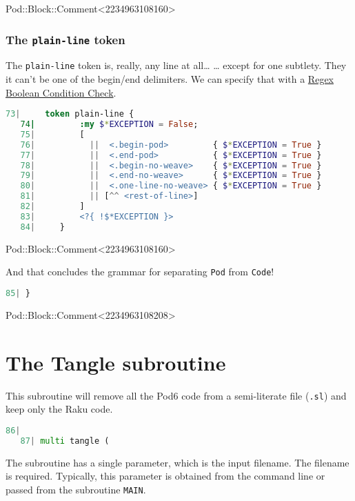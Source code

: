 \documentclass{scrartcl}
\begin{document}
Pod::Block::Comment<2234963108160>

\subsubsection{The \texttt{plain-line} token}

The \texttt{plain-line} token is, really, any line at all… … except for one
subtlety. They it can't be one of the begin/end delimiters. We can specify
that with a
\href{https://docs.raku.org/language/regexes\#Regex_Boolean_condition_check}{Regex
Boolean Condition Check}.

\begin{lstlisting}[language=Raku]
   73|     token plain-line {
   74|         :my $*EXCEPTION = False;
   75|         [
   76|           ||  <.begin-pod>         { $*EXCEPTION = True }
   77|           ||  <.end-pod>           { $*EXCEPTION = True }
   78|           ||  <.begin-no-weave>    { $*EXCEPTION = True }
   79|           ||  <.end-no-weave>      { $*EXCEPTION = True }
   80|           ||  <.one-line-no-weave> { $*EXCEPTION = True }
   81|           || [^^ <rest-of-line>]
   82|         ]
   83|         <?{ !$*EXCEPTION }>
   84|     } 

\end{lstlisting}


Pod::Block::Comment<2234963108160>

And that concludes the grammar for separating \texttt{Pod} from
\texttt{Code}!

\begin{lstlisting}[language=Raku]
   85| } 

\end{lstlisting}


Pod::Block::Comment<2234963108208>

\section{The Tangle subroutine}

This subroutine will remove all the Pod6 code from a semi-literate file
(\texttt{.sl}) and keep only the Raku code.

\begin{lstlisting}[language=Raku]
   86| 
   87| multi tangle (

\end{lstlisting}


The subroutine has a single parameter, which is the input filename. The
filename is required. Typically, this parameter is obtained from the
command line or passed from the subroutine \texttt{MAIN}.
\end{document}
